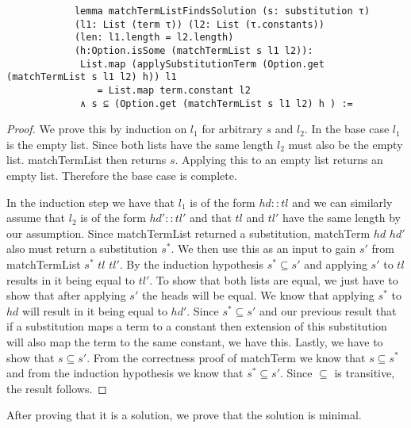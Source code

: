 \documentclass{article}
\begin{document}
        \begin{lstlisting}
            lemma matchTermListFindsSolution (s: substitution τ)
            (l1: List (term τ)) (l2: List (τ.constants))
            (len: l1.length = l2.length)
            (h:Option.isSome (matchTermList s l1 l2)):
             List.map (applySubstitutionTerm (Option.get (matchTermList s l1 l2) h)) l1 
                = List.map term.constant l2 
             ∧ s ⊆ (Option.get (matchTermList s l1 l2) h ) :=
        \end{lstlisting}
        \begin{proof}
            We prove this by induction on $l_1$ for arbitrary $s$ and $l_2$.
            In the base case $l_1$ is the empty list. Since both lists have the same length $l_2$ must also be the empty list. matchTermList then returns $s$. Applying this to an empty list returns an empty list. Therefore the base case is complete.

            In the induction step we have that $l_1$ is of the form $hd::tl$ and we can similarly assume that $l_2$ is of the form $hd'::tl'$ and that $tl$ and $tl'$ have the same length by our assumption. Since matchTermList returned a substitution, matchTerm $hd$ $hd'$ also must return a substitution $s^\ast$.
            We then use this as an input to gain $s'$ from matchTermList $s^\ast$ $tl$ $tl'$. By the induction hypothesis $s^\ast \subseteq s'$ and applying $s'$ to $tl$ results in it being equal to $tl'$. To show that both lists are equal, we just have to show that after applying $s'$ the heads will be equal. We know that applying $s^\ast$ to $hd$ will result in it being equal to $hd'$. Since $s^\ast \subseteq s'$ and our previous result that if a substitution maps a term to a constant then extension of this substitution will also map the term to the same constant, we have this.
            Lastly, we have to show that $s \subseteq s'$. From the correctness proof of matchTerm we know that $s \subseteq s^\ast$ and from the induction hypothesis we know that $s^\ast \subseteq s'$. Since $\subseteq$ is transitive, the result follows.
        \end{proof}

        After proving that it is a solution, we prove that the solution is minimal.
\end{document}
